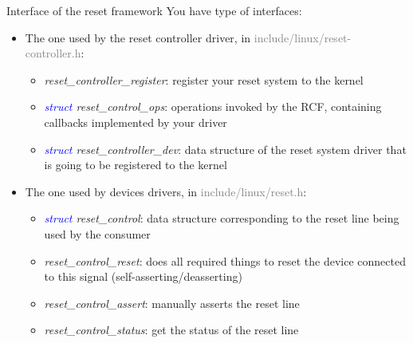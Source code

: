 \documentclass{beamer}
\begin{document}
\begin{frame}{Interface of the reset framework}
	You have type of interfaces:
	\begin{itemize}
		\item The one used by the reset controller driver, in \textcolor{gray}{include/linux/reset-controller.h}:
			\begin{itemize}
				\item \textit{reset\_controller\_register}: register your reset system to the kernel
				\item \textit{\textcolor{blue}{struct} reset\_control\_ops}: operations invoked by the RCF, containing callbacks implemented by your driver
				\item \textit{\textcolor{blue}{struct} reset\_controller\_dev}: data structure of the reset system driver that is going to be registered to the kernel
			\end{itemize}
	\end{itemize}
	\begin{itemize}
		\item The one used by devices drivers, in \textcolor{gray}{include/linux/reset.h}:
			\begin{itemize}
				\item \textit{\textcolor{blue}{struct} reset\_control}: data structure corresponding to the reset line being used by the consumer
				\item \textit{reset\_control\_reset}: does all required things to reset the device connected to this signal (self-asserting/deasserting)
				\item \textit{reset\_control\_assert}: manually asserts the reset line
				\item \textit{reset\_control\_status}: get the status of the reset line
			\end{itemize}
	\end{itemize}
\end{frame}
\end{document}
